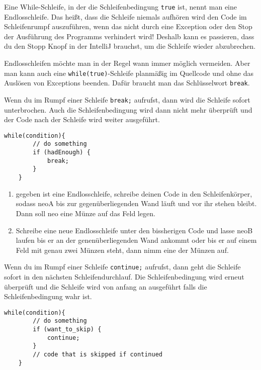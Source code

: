 
\begin{Infobox}
	Eine While-Schleife, in der die Schleifenbedingung \lstinline{true} ist, nennt man eine Endlosschleife.
	Das heißt, dass die Schleife niemals aufhören wird den Code im Schleifenrumpf auszuführen, wenn das nicht durch eine Exception oder den Stop der Ausführung des Programms verhindert wird!
	Deshalb kann es passieren, dass du den Stopp Knopf in der IntelliJ brauchst, um die Schleife wieder abzubrechen.\newline

	Endlosschleifen möchte man in der Regel wann immer möglich vermeiden.
	Aber man kann auch eine \lstinline{while(true)}-Schleife planmäßig im Quellcode und ohne das Auslösen von Exceptions beenden.
	Dafür braucht man das Schlüsselwort \lstinline{break}.\newline

	Wenn du im Rumpf einer Schleife \lstinline{break;} aufrufst, dann wird die Schleife sofort unterbrochen.
	Auch die Schleifenbedingung wird dann nicht mehr überprüft und der Code nach der Schleife wird weiter ausgeführt.

	\begin{lstlisting}[numbers=none]
	while(condition){
		// do something
		if (hadEnough) {
			break;
		}
	}
	\end{lstlisting}
\end{Infobox}

\begin{enumerate} \setcounter{enumi}{0}
    \item gegeben ist eine Endlosschleife, schreibe deinen Code in den Schleifenkörper, sodass neoA bis zur gegenüberliegenden Wand läuft und vor ihr stehen bleibt. Dann soll neo eine Münze auf das Feld legen.
    \item Schreibe eine neue Endlosschleife unter den bissherigen Code und lasse neoB laufen bis er an der genenüberliegenden Wand ankommt oder bis er auf einem Feld mit genau zwei Münzen steht, dann nimm eine der Münzen auf.
\end{enumerate}

\begin{Infobox}
	Wenn du im Rumpf einer Schleife \lstinline{continue;} aufrufst, dann geht die Schleife sofort in den nächsten Schleifendurchlauf.
	Die Schleifenbedingung wird erneut überprüft und die Schleife wird von anfang an ausgeführt falls die Schleifenbedingung wahr ist.

	\begin{lstlisting}[numbers=none]
	while(condition){
		// do something
		if (want_to_skip) {
			continue;
		}
		// code that is skipped if continued
	}
	\end{lstlisting}

\end{Infobox}

